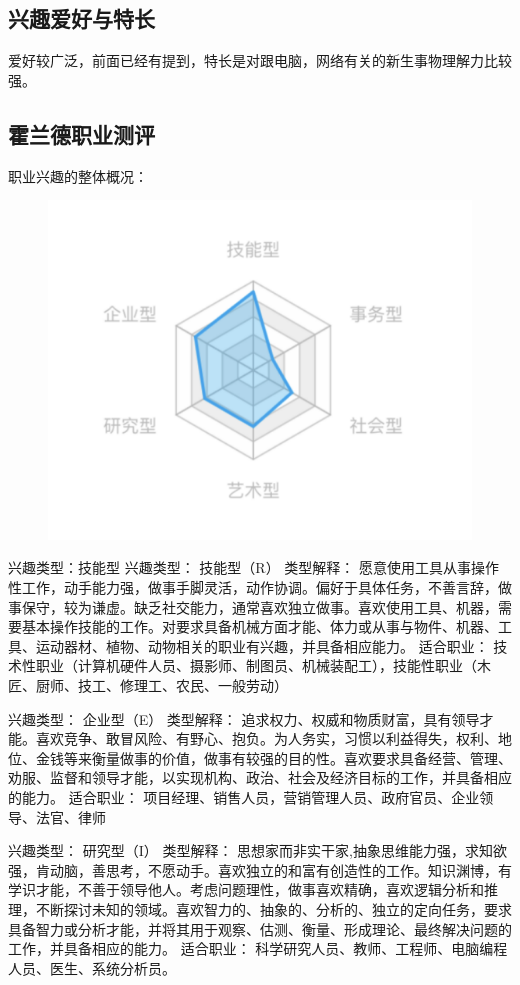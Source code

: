 \documentclass{article}
\begin{document}
\subsection{兴趣爱好与特长}
爱好较广泛，前面已经有提到，特长是对跟电脑，网络有关的新生事物理解力比较强。\par
\subsection{霍兰德职业测评}
职业兴趣的整体概况：
\begin{figure}[H]
	\centering
	\includegraphics[width=0.7\linewidth]{图片1}
	\caption{}
	\label{fig:1}
\end{figure}

兴趣类型：技能型
兴趣类型：
技能型（R）
类型解释：
愿意使用工具从事操作性工作，动手能力强，做事手脚灵活，动作协调。偏好于具体任务，不善言辞，做事保守，较为谦虚。缺乏社交能力，通常喜欢独立做事。喜欢使用工具、机器，需要基本操作技能的工作。对要求具备机械方面才能、体力或从事与物件、机器、工具、运动器材、植物、动物相关的职业有兴趣，并具备相应能力。
适合职业：
技术性职业（计算机硬件人员、摄影师、制图员、机械装配工），技能性职业（木匠、厨师、技工、修理工、农民、一般劳动）\par
兴趣类型：
企业型（E）
类型解释：
追求权力、权威和物质财富，具有领导才能。喜欢竞争、敢冒风险、有野心、抱负。为人务实，习惯以利益得失，权利、地位、金钱等来衡量做事的价值，做事有较强的目的性。喜欢要求具备经营、管理、劝服、监督和领导才能，以实现机构、政治、社会及经济目标的工作，并具备相应的能力。
适合职业：
项目经理、销售人员，营销管理人员、政府官员、企业领导、法官、律师\par
兴趣类型：
研究型（I）
类型解释：
思想家而非实干家,抽象思维能力强，求知欲强，肯动脑，善思考，不愿动手。喜欢独立的和富有创造性的工作。知识渊博，有学识才能，不善于领导他人。考虑问题理性，做事喜欢精确，喜欢逻辑分析和推理，不断探讨未知的领域。喜欢智力的、抽象的、分析的、独立的定向任务，要求具备智力或分析才能，并将其用于观察、估测、衡量、形成理论、最终解决问题的工作，并具备相应的能力。
适合职业：
科学研究人员、教师、工程师、电脑编程人员、医生、系统分析员。\par
\end{document}
